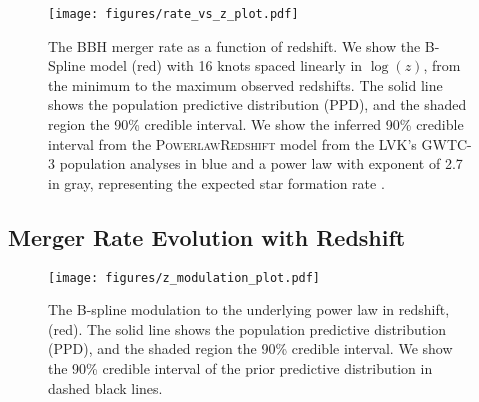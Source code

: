\begin{figure}[ht!]
    \texttt{[image: figures/rate\_vs\_z\_plot.pdf]}
    \caption{The BBH merger rate as a function of redshift. We show the B-Spline model (red) with 16 knots spaced linearly in $\log(z)$, 
    from the minimum to the maximum observed redshifts. The solid line shows the population predictive distribution (PPD), and the shaded region 
    the 90\% credible interval. We show the inferred 90\% credible interval from the \textsc{PowerlawRedshift} model 
    from the LVK's GWTC-3 population analyses in blue and a power law with exponent of 2.7 in gray, representing the expected star formation rate 
    \citep{Madau_2014, o3b_astro_dist}.}
    \label{fig:rofz}
\end{figure}

\subsection{Merger Rate Evolution with Redshift} \label{sec:redshift}

\begin{figure}[ht!]
    \texttt{[image: figures/z\_modulation\_plot.pdf]}
    \caption{The B-spline modulation to the underlying power law in redshift, (red). The solid line shows the population predictive distribution (PPD),
    and the shaded region the 90\% credible interval. We show the 90\% credible interval of the prior predictive distribution in dashed black lines.}
    \label{fig:z_modulation}
\end{figure}

